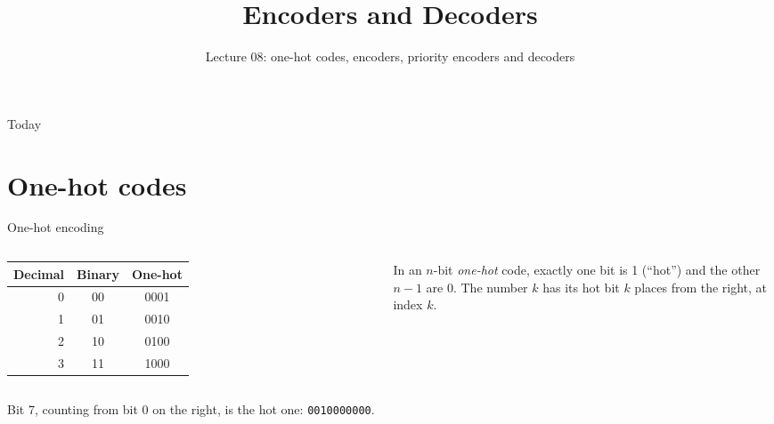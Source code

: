 \documentclass[10pt]{wosm-slides}
\title[Lecture 08 \textperiodcentered\ Encoders and Decoders]{Encoders and Decoders}
\subtitle{Lecture 08: one-hot codes, encoders, priority encoders and decoders}
\begin{document}
\maketitle

\begin{frame}{Today}
  \tableofcontents
\end{frame}

\section{One-hot codes}

\begin{frame}{One-hot encoding}
  \begin{columns}[c, totalwidth=\textwidth]
      \centering
      \begin{tabular}{@{}rcc@{}}
        \toprule
        Decimal & Binary & One-hot \\
        \midrule
        0 & 00 & 0001 \\
        1 & 01 & 0010 \\
        2 & 10 & 0100 \\
        3 & 11 & 1000 \\
        \bottomrule
      \end{tabular}
      \begin{definition}
        In an $n$-bit \emph{one-hot} code, exactly one bit is 1 (\enquote{hot}) and
        the other $n - 1$ are 0. The number $k$ has its hot bit $k$ places from the
        right, at index $k$.
      \end{definition}
  \end{columns}

  \bigskip
  \begin{example}
    Bit 7, counting from bit 0 on the right, is the hot one: \texttt{0010000000}.
  \end{example}
\end{frame}
\end{document}
